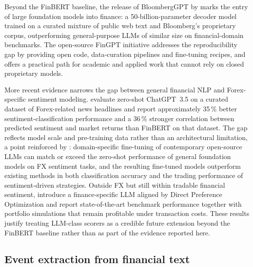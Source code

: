 Beyond the FinBERT baseline, the release of BloombergGPT by  marks the entry of large foundation models into finance: a 50-billion-parameter decoder model trained on a curated mixture of public web text and Bloomberg's proprietary corpus, outperforming general-purpose LLMs of similar size on financial-domain benchmarks. The open-source FinGPT initiative \cite{liu2023fingpt} addresses the reproducibility gap by providing open code, data-curation pipelines and fine-tuning recipes, and offers a practical path for academic and applied work that cannot rely on closed proprietary models.

More recent evidence narrows the gap between general financial NLP and Forex-specific sentiment modeling.  evaluate zero-shot ChatGPT~3.5 on a curated dataset of Forex-related news headlines and report approximately 35\,\% better sentiment-classification performance and a 36\,\% stronger correlation between predicted sentiment and market returns than FinBERT on that dataset. The gap reflects model scale and pre-training data rather than an architectural limitation, a point reinforced by : domain-specific fine-tuning of contemporary open-source LLMs can match or exceed the zero-shot performance of general foundation models on FX sentiment tasks, and the resulting fine-tuned models outperform existing methods in both classification accuracy and the trading performance of sentiment-driven strategies. Outside FX but still within tradable financial sentiment,  introduce a finance-specific LLM aligned by Direct Preference Optimization and report state-of-the-art benchmark performance together with portfolio simulations that remain profitable under transaction costs. These results justify treating LLM-class scorers as a credible future extension beyond the FinBERT baseline rather than as part of the evidence reported here.

\subsection{Event extraction from financial text} \label{subsec:event-extraction}

